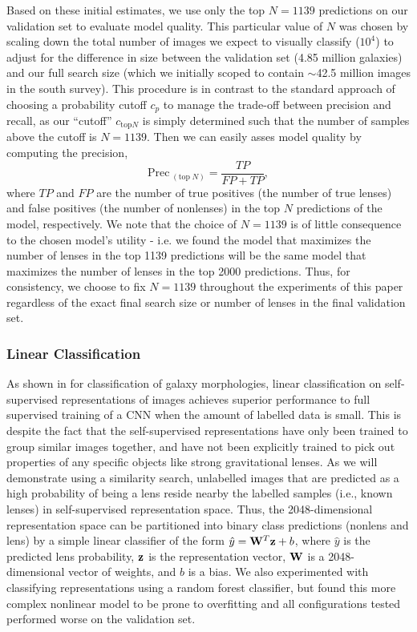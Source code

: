 \documentclass{aastex631}
\begin{document}
Based on these initial estimates, we use only the top $N=1139$ predictions on our validation set to evaluate model quality. This particular value of $N$ was chosen by scaling down the total number of images we expect to visually classify ($10^4$) to adjust for the difference in size between the validation set (4.85 million galaxies) and our full search size (which we initially scoped to contain $\sim$42.5 million images in the south survey). This procedure is in contrast to the standard approach of choosing a probability cutoff $c_p$ to manage the trade-off between precision and recall, as our ``cutoff'' $c_{\mathrm{top }N}$ is simply determined such that the number of samples above the cutoff is $N=1139$. Then we can easily asses model quality by computing the precision, 
\begin{equation}
    \label{eq:precision}
    \mathrm{Prec}_{\;( \mathrm{top} \; N)} = \frac{TP}{FP+TP},
\end{equation}
where $TP$ and $FP$ are the number of true positives (the number of true lenses) and false positives (the number of nonlenses) in the top $N$ predictions of the model, respectively. We note that the choice of $N=1139$ is of little consequence to the chosen model's utility - i.e. we found the model that maximizes the number of lenses in the top 1139 predictions will be the same model that maximizes the number of lenses in the top 2000 predictions. Thus, for consistency, we choose to fix $N=1139$ throughout the experiments of this paper regardless of the exact final search size or number of lenses in the final validation set.    

\subsubsection{Linear Classification}
\label{sec:linear_classification}

As shown in \citet{Hayat_2021} for classification of galaxy morphologies, linear classification on self-supervised representations of images achieves superior performance to full supervised training of a CNN when the amount of labelled data is small. This is despite the fact that the self-supervised representations have only been trained to group similar images together, and have not been explicitly trained to pick out properties of any specific objects like strong gravitational lenses. As we will demonstrate using a similarity search, unlabelled images that are predicted as a high probability of being a lens reside nearby the labelled samples (i.e., known lenses) in self-supervised representation space. Thus, the 2048-dimensional representation space can be partitioned into binary class predictions (nonlens and lens) by a simple linear classifier of the form $\hat{y} = {\bf{W}}^T {\bf{z}}  + b$, where $\hat{y}$ is the predicted lens probability, $\bf{z}$ is the representation vector, $\bf{W}$ is a 2048-dimensional vector of weights, and $b$ is a bias. We also experimented with classifying representations using a random forest classifier, but found this more complex nonlinear model to be prone to overfitting and all configurations tested performed worse on the validation set.
\end{document}
